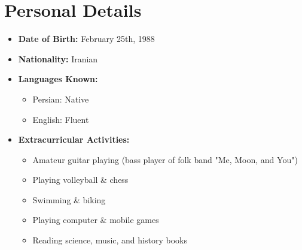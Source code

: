 \documentclass{cv}
\begin{document}

\section{Personal Details}

\begin{itemize}

\item
\textbf{Date of Birth:}
February 25th, 1988


\item
{\bf Nationality:}
Iranian

\item
\textbf{Languages Known:}
\begin{itemize}

\item
Persian: Native

\item
English: Fluent
%
\end{itemize}

\item
\textbf{Extracurricular Activities:}

\begin{itemize}
\item
Amateur guitar playing (bass player of folk band "Me, Moon, and You")
\item
Playing volleyball \& chess
\item
Swimming \& biking
\item
Playing computer \& mobile games
\item
Reading science, music, and history books
\end{itemize} 


\end{itemize}

\end{document}

